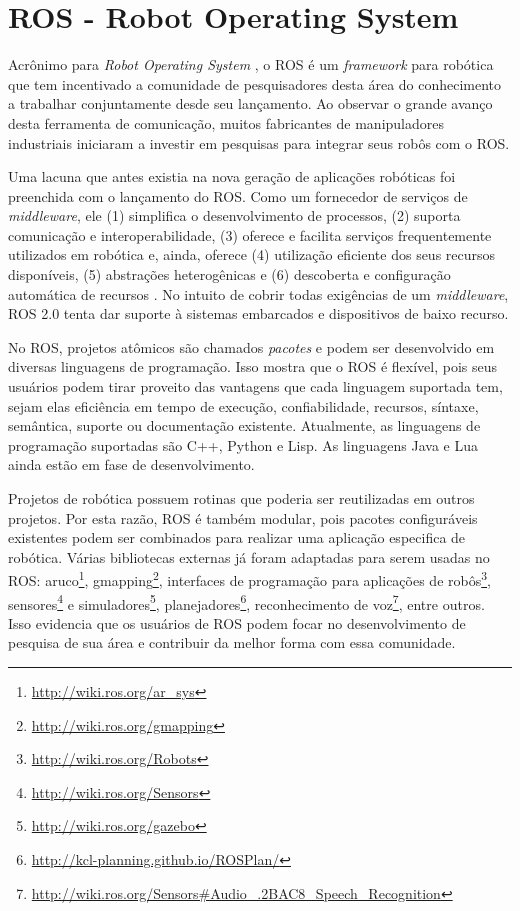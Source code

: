     \section{ROS - Robot Operating System} \label{sec:ros}
        Acrônimo para \textit{Robot Operating System} \cite{ref:quigley2009ros}, o ROS é um \textit{framework} para robótica que tem incentivado a comunidade de pesquisadores desta área do conhecimento a trabalhar conjuntamente desde seu lançamento. Ao observar o grande avanço desta ferramenta de comunicação, muitos fabricantes de manipuladores industriais iniciaram a investir em pesquisas para integrar seus robôs com o ROS. 
        
        Uma lacuna que antes existia na nova geração de aplicações robóticas foi preenchida com o lançamento do ROS. Como um fornecedor de serviços de \textit{middleware}, ele (1) simplifica o desenvolvimento de processos, (2) suporta comunicação e interoperabilidade, (3) oferece e facilita serviços frequentemente utilizados em robótica e, ainda, oferece (4) utilização eficiente dos seus recursos disponíveis, (5) abstrações heterogênicas e (6) descoberta e configuração automática de recursos \cite{ref:quigley2009ros}. No intuito de cobrir todas exigências de um \textit{middleware}, ROS 2.0 tenta dar suporte à sistemas embarcados e dispositivos de baixo recurso.
    
        No ROS, projetos atômicos são chamados \textit{pacotes} e podem ser desenvolvido em diversas linguagens de programação. Isso mostra que o ROS é flexível, pois seus usuários podem tirar proveito das vantagens que cada linguagem suportada tem, sejam elas eficiência em tempo de execução, confiabilidade, recursos, síntaxe, semântica, suporte ou documentação existente. Atualmente, as linguagens de programação suportadas são C++, Python e Lisp. As linguagens Java e Lua ainda estão em fase de desenvolvimento.
        
        Projetos de robótica possuem rotinas que poderia ser reutilizadas em outros projetos. Por esta razão, ROS é também modular, pois pacotes configuráveis existentes podem ser combinados para realizar uma aplicação especifica de robótica. Várias bibliotecas externas já foram adaptadas para serem usadas no ROS: aruco\footnote{\url{http://wiki.ros.org/ar_sys}}, gmapping\footnote{\url{http://wiki.ros.org/gmapping}}, interfaces de programação para aplicações de robôs\footnote{\url{http://wiki.ros.org/Robots}}, sensores\footnote{\url{http://wiki.ros.org/Sensors}} e simuladores\footnote{\url{http://wiki.ros.org/gazebo}}, planejadores\footnote{\url{http://kcl-planning.github.io/ROSPlan/}}, reconhecimento de voz\footnote{\url{http://wiki.ros.org/Sensors\#Audio_.2BAC8_Speech_Recognition}}, entre outros. Isso evidencia que os usuários de ROS podem focar no desenvolvimento de pesquisa de sua área e contribuir da melhor forma com essa comunidade.
        
